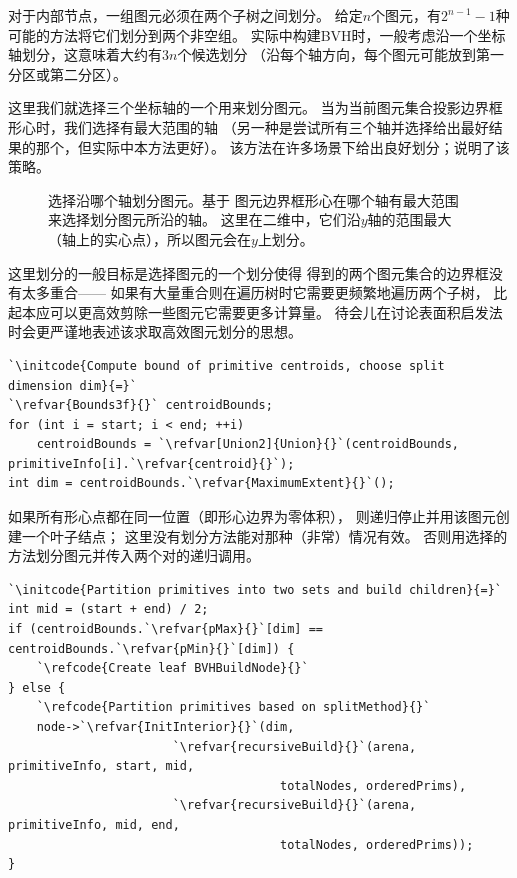 对于内部节点，一组图元必须在两个子树之间划分。
给定$n$个图元，有$2^{n-1}-1$种
可能的方法将它们划分到两个非空组。
实际中构建BVH时，一般考虑沿一个坐标轴划分，这意味着大约有$3n$个候选划分
（沿每个轴方向，每个图元可能放到第一分区或第二分区）。

这里我们就选择三个坐标轴的一个用来划分图元。
当为当前图元集合投影边界框形心时，我们选择有最大范围的轴
（另一种是尝试所有三个轴并选择给出最好结果的那个，但实际中本方法更好）。
该方法在许多场景下给出良好划分；说明了该策略。
\begin{figure}[htbp]
    \centering
    \caption{选择沿哪个轴划分图元。\protect{}基于
        图元边界框形心在哪个轴有最大范围来选择划分图元所沿的轴。
        这里在二维中，它们沿$y$轴的范围最大（轴上的实心点），所以图元会在$y$上划分。}
    \label{fig:4.3}
\end{figure}

这里划分的一般目标是选择图元的一个划分使得
得到的两个图元集合的边界框没有太多重合——
如果有大量重合则在遍历树时它需要更频繁地遍历两个子树，
比起本应可以更高效剪除一些图元它需要更多计算量。
待会儿在讨论表面积启发法时会更严谨地表述该求取高效图元划分的思想。
\begin{lstlisting}
`\initcode{Compute bound of primitive centroids, choose split dimension dim}{=}`
`\refvar{Bounds3f}{}` centroidBounds;
for (int i = start; i < end; ++i)
    centroidBounds = `\refvar[Union2]{Union}{}`(centroidBounds, primitiveInfo[i].`\refvar{centroid}{}`);
int dim = centroidBounds.`\refvar{MaximumExtent}{}`();
\end{lstlisting}

如果所有形心点都在同一位置（即形心边界为零体积），
则递归停止并用该图元创建一个叶子结点；
这里没有划分方法能对那种（非常）情况有效。
否则用选择的方法划分图元并传入两个对的递归调用。
\begin{lstlisting}
`\initcode{Partition primitives into two sets and build children}{=}`
int mid = (start + end) / 2;
if (centroidBounds.`\refvar{pMax}{}`[dim] == centroidBounds.`\refvar{pMin}{}`[dim]) {
    `\refcode{Create leaf BVHBuildNode}{}`
} else {
    `\refcode{Partition primitives based on splitMethod}{}`
    node->`\refvar{InitInterior}{}`(dim,
                       `\refvar{recursiveBuild}{}`(arena, primitiveInfo, start, mid,
                                      totalNodes, orderedPrims),
                       `\refvar{recursiveBuild}{}`(arena, primitiveInfo, mid, end,
                                      totalNodes, orderedPrims));
}
\end{lstlisting}

